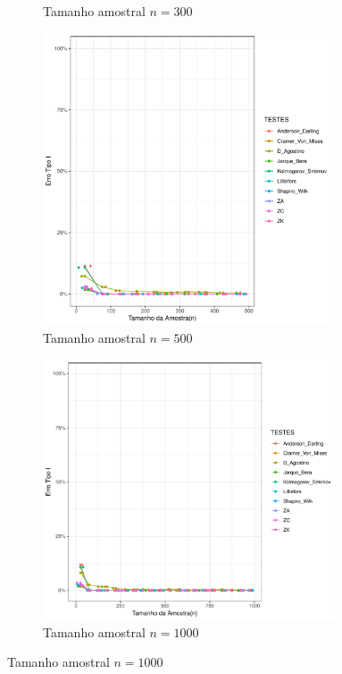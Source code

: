 \documentclass[a4paper,11pt]{article} %
\begin{document}
\begin{figure}[H]
\begin{subfigure}[b]{0.45\textwidth}
        \caption{Tamanho amostral \(n = 300\)}
        \label{fig:cauchy_300}
    \end{subfigure}
    
    \vspace{0.5cm} %
    \begin{subfigure}[b]{0.45\textwidth}
        \centering
        \includegraphics[width=0.95\textwidth]{Distribuição Cauchy/Erro Tipo I/erro_tipo_I_cauchy_500.pdf}
        \caption{Tamanho amostral \(n = 500\)}
        \label{fig:cauchy_500}
    \end{subfigure}
    \hfill
    \begin{subfigure}[b]{0.45\textwidth}
        \centering
        \includegraphics[width=0.95\textwidth]{Distribuição Cauchy/Erro Tipo I/erro_tipo_I_cauchy_1000.pdf}
        \caption{Tamanho amostral \(n = 1000\)}
        \label{fig:cauchy_1000}
    \end{subfigure}
\end{figure}
\end{document}
